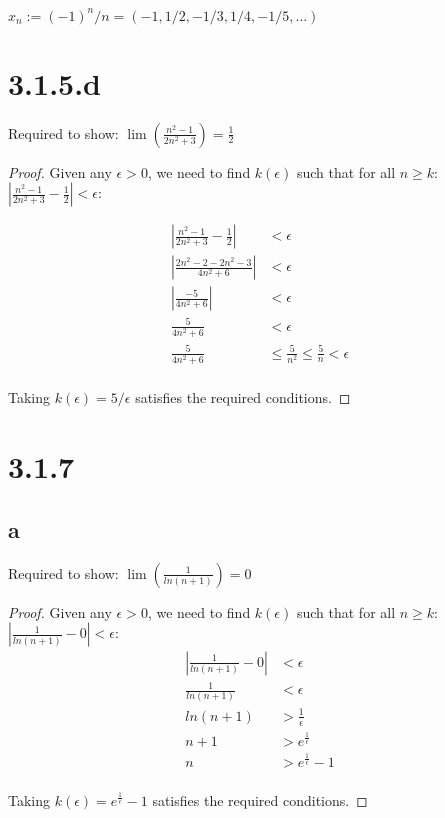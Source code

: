 \documentclass{article}
\begin{document}
$x_n := (-1)^n/n = (-1, 1/2, -1/3, 1/4, -1/5, ...)$

\section*{3.1.5.d}
Required to show: $\lim (\frac{n^2 - 1}{2n^2 + 3}) = \frac{1}{2}$

\begin{proof}
  Given any $\epsilon > 0$, we need to find $k(\epsilon)$ such that for all $n \geq k$: $|\frac{n^2 - 1}{2n^2 + 3} - \frac{1}{2}| < \epsilon$:

   \begin{align*}
    |\frac{n^2 - 1}{2n^2 + 3} - \frac{1}{2}| &< \epsilon \\
    |\frac{2n^2 - 2 - 2n^2 - 3}{4n^2 + 6}| &< \epsilon \\
    |\frac{-5}{4n^2 + 6}| &< \epsilon \\
    \frac{5}{4n^2 + 6} &< \epsilon \\
    \frac{5}{4n^2 + 6} &\leq \frac{5}{n^2} \leq \frac{5}{n} < \epsilon \\
  \end{align*}

  \noindent
  Taking $k(\epsilon)=5/\epsilon$ satisfies the required conditions.

\end{proof}

\section*{3.1.7}

\subsection*{a}
Required to show: $\lim (\frac{1}{ln(n+1)}) = 0$
\begin{proof}
  Given any $\epsilon > 0$, we need to find $k(\epsilon)$ such that for all $n \geq k$: $|\frac{1}{ln(n+1)} - 0| < \epsilon$:
  \begin{align*}
    |\frac{1}{ln(n+1)} - 0| &< \epsilon \\
    \frac{1}{ln(n+1)} &< \epsilon \\
    ln(n+1) &> \frac{1}{\epsilon} \\
    n+1 &> e^\frac{1}{\epsilon} \\
    n &>  e^\frac{1}{\epsilon} - 1 \\
  \end{align*}

  Taking $k(\epsilon)= e^\frac{1}{\epsilon} - 1$ satisfies the required conditions.

\end{proof}
\end{document}
